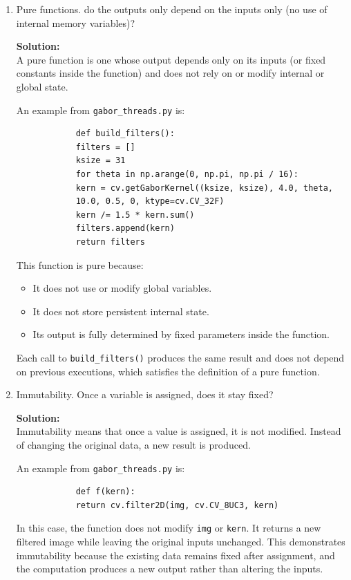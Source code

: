 \documentclass[11pt]{article}
\begin{document}
	\begin{enumerate}
		\item[i.] Pure functions. do the outputs only depend on the inputs only (no use of internal memory variables)?
		
		\textbf{Solution:}\\
		A pure function is one whose output depends only on its inputs (or fixed constants inside the function) and does not rely on or modify internal or global state.
		
		An example from \texttt{gabor\_threads.py} is:
		
		\begin{verbatim}
			def build_filters():
			filters = []
			ksize = 31
			for theta in np.arange(0, np.pi, np.pi / 16):
			kern = cv.getGaborKernel((ksize, ksize), 4.0, theta,
			10.0, 0.5, 0, ktype=cv.CV_32F)
			kern /= 1.5 * kern.sum()
			filters.append(kern)
			return filters
		\end{verbatim}
		
		This function is pure because:
		\begin{itemize}
			\item It does not use or modify global variables.
			\item It does not store persistent internal state.
			\item Its output is fully determined by fixed parameters inside the function.
		\end{itemize}
		
		Each call to \texttt{build\_filters()} produces the same result and does not depend on previous executions, which satisfies the definition of a pure function.
		
		\item[ii.] Immutability. Once a variable is assigned, does it stay fixed?
		
		\textbf{Solution:}\\
		Immutability means that once a value is assigned, it is not modified. Instead of changing the original data, a new result is produced.
		
		An example from \texttt{gabor\_threads.py} is:
		
		\begin{verbatim}
			def f(kern):
			return cv.filter2D(img, cv.CV_8UC3, kern)
		\end{verbatim}
		
		In this case, the function does not modify \texttt{img} or \texttt{kern}. It returns a new filtered image while leaving the original inputs unchanged. This demonstrates immutability because the existing data remains fixed after assignment, and the computation produces a new output rather than altering the inputs.
		

\end{enumerate}
\end{document}
